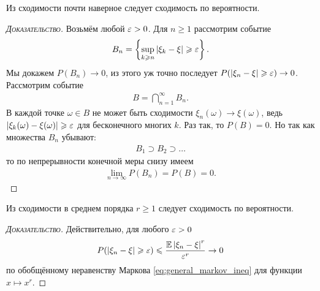 \documentclass[../main.tex]{subfiles}
\begin{document}
\begin{prop}
 Из сходимости почти наверное следует сходимость по вероятности.
\end{prop}
\begin{proof}[\normalfont\textsc{Доказательство}]
 Возьмём любой $ \varepsilon > 0 $. Для $ n \geqslant 1 $ рассмотрим событие
 \begin{align*}
  B_n = \left\{ \sup_{k \geqslant n} \left| \xi_k - \xi \right| \geqslant \varepsilon \right\}.
 \end{align*} Мы докажем $ P(B_n) \to 0 $, из этого уж точно последует $ P(\left| \xi_n-\xi \right| \geqslant \varepsilon) \to 0 $. Рассмотрим событие
 \begin{align*}
  B = \bigcap_{n=1}^{\infty} B_n.
 \end{align*} В каждой точке $ \omega \in B $ не может быть сходимости $ \xi_n(\omega) \to \xi(\omega) $, ведь $ \left| \xi_k(\omega) - \xi(\omega) \right| \geqslant \varepsilon $ для бесконечного многих $ k $. Раз так, то $ P(B) = 0 $. Но так как множества $ B_n $ убывают:
 \begin{align*}
  B_1 \supset B_2 \supset \ldots
 \end{align*} то по непрерывности конечной меры снизу имеем
 \begin{align*}
  \lim_{n \to \infty} P(B_n) = P(B) = 0.
 \end{align*}
\end{proof}

\begin{prop}
 Из сходимости в среднем порядка $ r \geqslant 1 $ следует сходимость по вероятности.
\end{prop}
\begin{proof}[\normalfont\textsc{Доказательство}]
 Действительно, для любого $ \varepsilon > 0 $
  \begin{align*}
  P(\left| \xi_n-\xi \right| \geqslant \varepsilon) \leqslant \frac{\mathbb E \left| \xi_n - \xi \right|^{r}}{\varepsilon^{r}} \to 0
 \end{align*} по обобщённому неравенству Маркова \eqref{eq:general_markov_ineq} для функции $ x \mapsto x^{r} $.
\end{proof}
\end{document}

